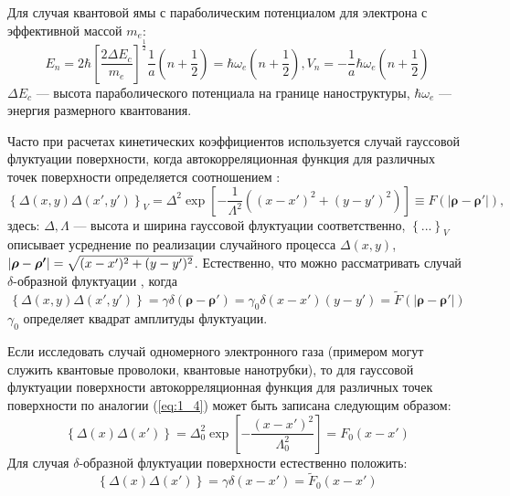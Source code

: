 Для случая квантовой ямы с параболическим потенциалом для электрона с эффективной массой $m_e$:
\begin{equation}
\label{eq:1_3}
E_n=2\hbar \left[ \frac{2\Delta E_c} {m_e} \right]^\frac{1}{2} \frac{1}{a}\left( n + \frac{1}{2} \right) = \hbar \omega_e \left( n + \frac{1}{2} \right), V_n = -\frac{1}{a} \hbar \omega_e \left( n + \frac{1}{2} \right)
\end{equation}
$\Delta E_c$ --- высота параболического потенциала на границе наноструктуры, $\hbar \omega_e$ --- энергия размерного квантования.

Часто при расчетах кинетических коэффициентов используется случай гауссовой флуктуации поверхности, когда автокорреляционная функция для различных точек поверхности определяется соотношением \cite{Sakaki1987,Shchurova2009,Pozdnyakov2006,Khanh2016,Gold1987,Thongnum2008,Su2013}:
\begin{equation}
\label{eq:1_4}
\left\{ \Delta(x,y)\Delta(x',y') \right\}_V = \Delta^2 \exp \left[ - \frac{1}{\Lambda^2} \left( (x-x')^2 +(y-y')^2 \right) \right] \equiv F \left( \left| \boldsymbol{\rho} - \boldsymbol{\rho'} \right| \right),
\end{equation}
здесь:
$\Delta, \Lambda$ --- высота и ширина гауссовой флуктуации соответственно, 
$\left\{ ... \right\}_V$
описывает усреднение по реализации случайного процесса 
$\Delta(x,y)$, $\left| \boldsymbol{\mathbf{\rho}} - \boldsymbol{\mathbf{\rho'}} \right| = \sqrt{(x-x')^2 + (y-y')^2}$.
Естественно, что можно рассматривать случай $\delta$-образной флуктуации \cite{Lozovik1998}, когда
\begin{equation}
\label{eq:1_5}
\left\{ \Delta(x,y)\Delta(x',y') \right\} = \gamma\delta\left( \boldsymbol{\rho} - \boldsymbol{\rho'} \right) = \gamma_0\delta(x-x')(y-y')=\tilde{F} \left(\left| \boldsymbol{\rho} - \boldsymbol{\rho'} \right|\right)
\end{equation}
$\gamma_0$ определяет квадрат амплитуды флуктуации.

Если исследовать случай одномерного электронного газа (примером могут служить квантовые проволоки, квантовые нанотрубки), то для гауссовой флуктуации поверхности автокорреляционная функция для различных точек поверхности по аналогии (\ref{eq:1_4}) может быть записана следующим образом:
\begin{equation}
\label{eq:1_6}
\left\{\Delta(x)\Delta(x')\right\}=\Delta^2_0 \exp \left[-\frac{(x-x')^2}{\Lambda^2_0}\right] = F_0(x-x')
\end{equation}
Для случая $\delta$-образной флуктуации поверхности естественно положить:
\begin{equation}
\label{eq:1_7}
\left\{\Delta(x)\Delta(x')\right\}= \gamma\delta(x-x') = \tilde{F}_0(x-x')
\end{equation}

